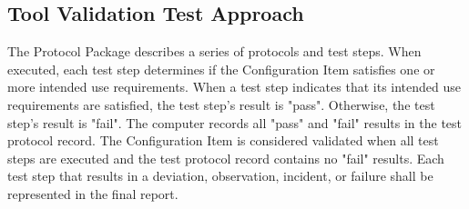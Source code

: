 \subsection{Tool Validation Test Approach}
The Protocol Package describes a series of protocols and test steps.  When
executed, each test step determines if the Configuration Item satisfies one or
more intended use requirements.  When a test step indicates that its
intended use requirements are satisfied, the test step's result is "pass".
Otherwise, the test step's result is "fail".  The computer records all "pass"
and "fail" results in the test protocol record.  The Configuration Item is
considered validated when all test steps are executed and the test protocol
record contains no "fail" results.  Each test step that results in a deviation,
observation, incident, or failure shall be represented in the final report.
